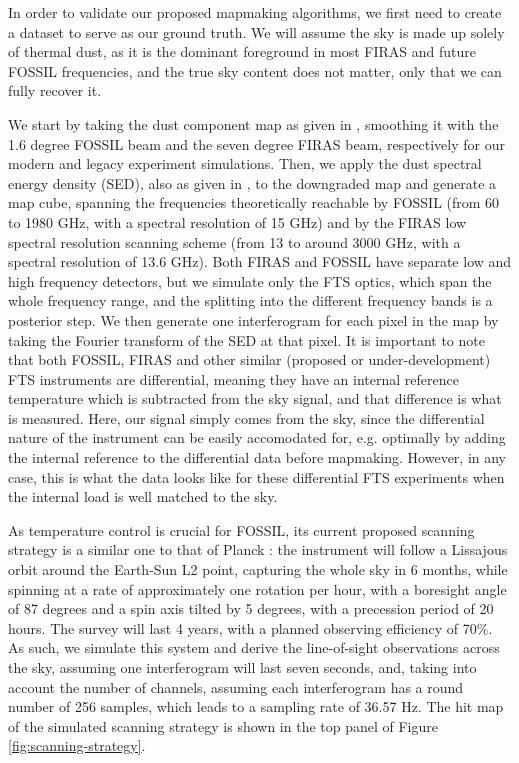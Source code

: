 \documentclass{aa}
\begin{document}
In order to validate our proposed mapmaking algorithms, we first need to create a dataset to serve as our ground truth. We will assume the sky is made up solely of thermal dust, as it is the dominant foreground in most FIRAS and future FOSSIL frequencies, and the true sky content does not matter, only that we can fully recover it.

We start by taking the dust component map as given in \cite{planck2014-a12}, smoothing it with the 1.6 degree FOSSIL beam and the seven degree FIRAS beam, respectively for our modern and legacy experiment simulations. Then, we apply the dust spectral energy density (SED), also as given in \cite{planck2014-a12}, to the downgraded map and generate a map cube, spanning the frequencies theoretically reachable by FOSSIL (from 60 to 1980 GHz, with a spectral resolution of 15 GHz) and by the FIRAS low spectral resolution scanning scheme (from 13 to around 3000 GHz, with a spectral resolution of 13.6 GHz). Both FIRAS and FOSSIL have separate low and high frequency detectors, but we simulate only the FTS optics, which span the whole frequency range, and the splitting into the different frequency bands is a posterior step. We then generate one interferogram for each pixel in the map by taking the Fourier transform of the SED at that pixel. It is important to note that both FOSSIL, FIRAS and other similar (proposed or under-development) FTS instruments are differential, meaning they have an internal reference temperature which is subtracted from the sky signal, and that difference is what is measured. Here, our signal simply comes from the sky, since the differential nature of the instrument can be easily accomodated for, e.g. optimally by adding the internal reference to the differential data before mapmaking. However, in any case, this is what the data looks like for these differential FTS experiments when the internal load is well matched to the sky.

As temperature control is crucial for FOSSIL, its current proposed scanning strategy is a similar one to that of Planck \citep{planckScan}: the instrument will follow a Lissajous orbit around the Earth-Sun L2 point, capturing the whole sky in 6 months, while spinning at a rate of approximately one rotation per hour, with a boresight angle of 87 degrees and a spin axis tilted by 5 degrees, with a precession period of 20 hours. The survey will last 4 years, with a planned observing efficiency of 70\%. As such, we simulate this system and derive the line-of-sight observations across the sky, assuming one interferogram will last seven seconds, and, taking into account the number of channels, assuming each interferogram has a round number of 256 samples, which leads to a sampling rate of 36.57 Hz. The hit map of the simulated scanning strategy is shown in the top panel of Figure \ref{fig:scanning-strategy}.
\end{document}
